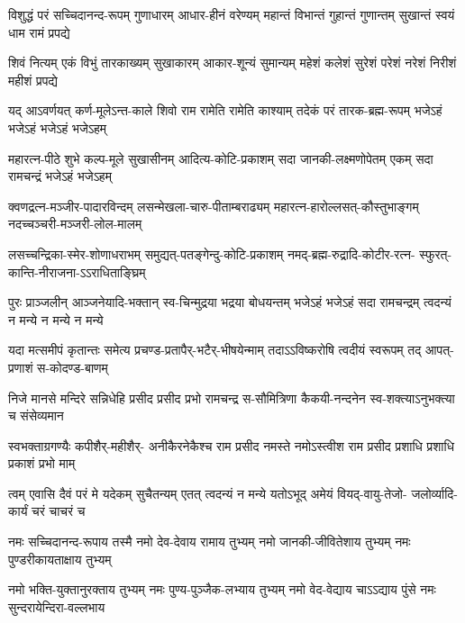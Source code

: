 

\fourlineindentedshloka
{विशुद्धं परं सच्चिदानन्द-रूपम्}
{गुणाधारम् आधार-हीनं वरेण्यम्}
{महान्तं विभान्तं गुहान्तं गुणान्तम्}
{सुखान्तं स्वयं धाम रामं प्रपद्ये}%

\fourlineindentedshloka
{शिवं नित्यम् एकं विभुं तारकाख्यम्}
{सुखाकारम् आकार-शून्यं सुमान्यम्}
{महेशं कलेशं सुरेशं परेशं}
{नरेशं निरीशं महीशं प्रपद्ये}%

\fourlineindentedshloka
{यद् आऽवर्णयत् कर्ण-मूलेऽन्त-काले}
{शिवो राम रामेति रामेति काश्याम्}
{तदेकं परं तारक-ब्रह्म-रूपम्}
{भजेऽहं भजेऽहं भजेऽहं भजेऽहम्}%

\fourlineindentedshloka
{महारत्न-पीठे शुभे कल्प-मूले}
{सुखासीनम् आदित्य-कोटि-प्रकाशम्}
{सदा जानकी-लक्ष्मणोपेतम् एकम्}
{सदा रामचन्द्रं भजेऽहं भजेऽहम्}%

\fourlineindentedshloka
{क्वणद्रत्न-मञ्जीर-पादारविन्दम्}
{लसन्मेखला-चारु-पीताम्बराढ्यम्}
{महारत्न-हारोल्लसत्-कौस्तुभाङ्गम्}
{नदच्चञ्चरी-मञ्जरी-लोल-मालम्}%

\fourlineindentedshloka
{लसच्चन्द्रिका-स्मेर-शोणाधराभम्}
{समुद्यत्-पतङ्गेन्दु-कोटि-प्रकाशम्}
{नमद्-ब्रह्म-रुद्रादि-कोटीर-रत्न-}
{स्फुरत्-कान्ति-नीराजना-ऽऽराधिताङ्घ्रिम्}%

\fourlineindentedshloka
{पुरः प्राञ्जलीन् आञ्जनेयादि-भक्तान्}
{स्व-चिन्मुद्रया भद्रया बोधयन्तम्}
{भजेऽहं भजेऽहं सदा रामचन्द्रम्}
{त्वदन्यं न मन्ये न मन्ये न मन्ये}%

\fourlineindentedshloka
{यदा मत्समीपं कृतान्तः समेत्य}
{प्रचण्ड-प्रतापैर्-भटैर्-भीषयेन्माम्}
{तदाऽऽविष्करोषि त्वदीयं स्वरूपम्}
{तद् आपत्-प्रणाशं स-कोदण्ड-बाणम्}%

\fourlineindentedshloka
{निजे मानसे मन्दिरे सन्निधेहि}
{प्रसीद प्रसीद प्रभो रामचन्द्र}
{स-सौमित्रिणा कैकयी-नन्दनेन}
{स्व-शक्त्याऽनुभक्त्या च संसेव्यमान}%

\fourlineindentedshloka
{स्वभक्ताग्रगण्यैः कपीशैर्-महीशैर्-}
{अनीकैरनेकैश्च राम प्रसीद}
{नमस्ते नमोऽस्त्वीश राम प्रसीद}
{प्रशाधि प्रशाधि प्रकाशं प्रभो माम्}%

\fourlineindentedshloka
{त्वम् एवासि दैवं परं मे यदेकम्}
{सुचैतन्यम् एतत् त्वदन्यं न मन्ये}
{यतोऽभूद् अमेयं वियद्-वायु-तेजो-}
{जलोर्व्यादि-कार्यं चरं चाचरं च}%

\fourlineindentedshloka
{नमः सच्चिदानन्द-रूपाय तस्मै}
{नमो देव-देवाय रामाय तुभ्यम्}
{नमो जानकी-जीवितेशाय तुभ्यम्}
{नमः पुण्डरीकायताक्षाय तुभ्यम्}%

\fourlineindentedshloka
{नमो भक्ति-युक्तानुरक्ताय तुभ्यम्}
{नमः पुण्य-पुञ्जैक-लभ्याय तुभ्यम्}
{नमो वेद-वेद्याय चाऽऽद्याय पुंसे}
{नमः सुन्दरायेन्दिरा-वल्लभाय}%

